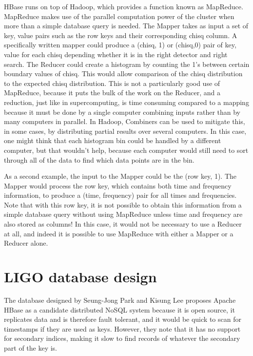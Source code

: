 \documentclass{article}
\begin{document}
HBase runs on top of Hadoop, which provides a function known as
MapReduce. MapReduce makes use of the parallel computation power of
the cluster when more than a simple database query is needed. The
Mapper takes as input a set of key, value pairs such as the row keys
and their corresponding chisq column. A specifically written mapper
could produce a (chisq, 1) or (chisq,0) pair of key, value for each
chisq depending whether it is in the right detector and right
search. The Reducer could create a histogram by counting the 1's
between certain boundary values of chisq. This would allow comparison of the
chisq distribution to the expected chisq distribution. This is not a
particularly good use of MapReduce, because it puts the bulk of the
work on the Reducer, and a reduction, just like in supercomputing, is
time consuming compared to a mapping because it must be done by a
single computer combining inputs rather than by many computers in
parallel. In Hadoop, Combiners can be used to mitigate this, in some
cases, by distributing partial results over several computers. In this
case, one might think that each histogram bin could be handled by a
different computer, but that wouldn't help, because each computer
would still need to sort through all of the data to find which data
points are in the bin.

As a second example, the input to the Mapper could be the (row key,
1). The Mapper would process the row key, which contains both time and
frequency information, to produce a (time, frequency) pair for all times
and frequencies. Note that with this row key, it is not possible to
obtain this information from a simple database query without using
MapReduce unless time and frequency are also stored as columns! In
this case, it would not be necessary to use a Reducer at all, and
indeed it is possible to use MapReduce with either a Mapper or a
Reducer alone.


\section{LIGO database design}

The database designed by Seung-Jong Park and Kisung Lee proposes
Apache HBase as a candidate distributed NoSQL system because it is
open source, it replicates data and is therefore fault tolerant, and
it would be quick to scan for timestamps if they are used as
keys. However, they note that it has no support for secondary indices,
making it slow to find records of whatever the secondary part of the
key is.
\end{document}
